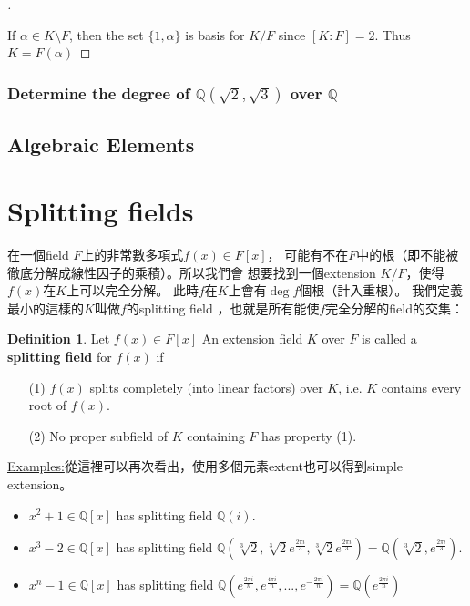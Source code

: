 \documentclass{article}
\theoremstyle{definition}
\newcommand{\ex}{\noindent\underline{Examples:}}
\newtheorem{dfn}{Definition}
\newenvironment{proofs}[1][\proofname]{%
  \begin{proof}[#1]$ $\par\nobreak\ignorespaces
}{%
  \end{proof}
}
\newcommand{\QQ}{\mathbb Q}
\begin{document}
\begin{proofs}
	If $\alpha\in K\setminus F$, then the set $\{1,\alpha\}$ is basis for $K/F$ since $[K:F]=2$. Thus $K=F(\alpha)$
\end{proofs}

\subsubsection*{Determine the degree of $\QQ(\sqrt{2},\sqrt{3})$ over $\QQ$}


\subsection{Algebraic Elements}

\section{Splitting fields}

在一個field $F$上的非常數多項式$f(x)\in F[x]$，
可能有不在$F$中的根（即不能被徹底分解成線性因子的乘積）。所以我們會
想要找到一個extension $K/F$，使得$f(x)$在$K$上可以完全分解。
此時$f$在$K$上會有$\deg f$個根（計入重根）。
我們定義最小的這樣的$K$叫做$f$的splitting field
，也就是所有能使$f$完全分解的field的交集：

\begin{dfn}
	Let $f(x) \in F[x]$ An extension field $K$ over $F$ is called a \textbf{splitting field} for $f(x)$ if 
	\begin{enumerate}
		\item[(1)] $f(x)$ splits completely (into linear factors) over $K$, i.e. $K$ contains every root of $f(x)$.

		\item[(2)] No proper subfield of $K$ containing $F$ has property (1).
	\end{enumerate}
\end{dfn}

\ex 從這裡可以再次看出，使用多個元素extent也可以得到simple extension。

	\begin{itemize}
		\item $x^2 + 1 \in \mathbb{Q}[x]$ has splitting field $\mathbb{Q}(i)$.
		
		\item $x^3 - 2 \in \mathbb{Q}[x]$ has splitting field $\mathbb{Q}(\sqrt[3]{2}, \sqrt[3]{2} e^{\frac{2 \pi i}{3}}, \sqrt[3]{2} e^{\frac{2 \pi i}{3}}) = \mathbb{Q}(\sqrt[3]{2}, e^{\frac{2 \pi i}{3}})$.

		\item $x^n - 1 \in \mathbb{Q}[x]$ has splitting field $\mathbb{Q}(e^{\frac{2 \pi i}{n}}, e^{\frac{4 \pi i}{n}}, ..., e^{-\frac{2 \pi i}{n}}) = \mathbb{Q}(e^{\frac{2 \pi i}{n}})$
	\end{itemize}
\end{document}
